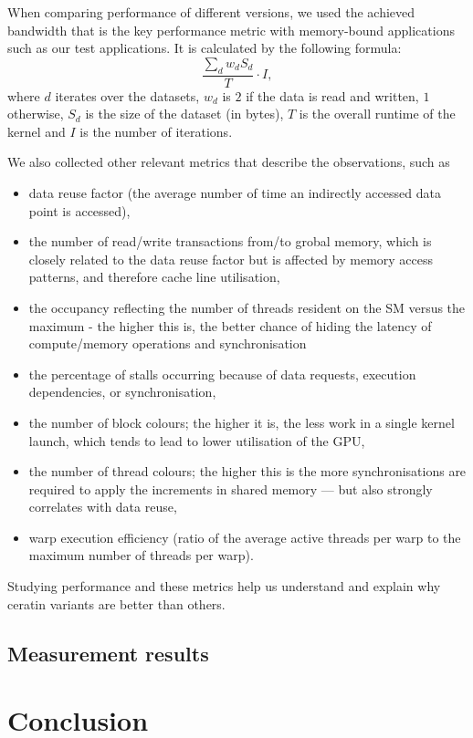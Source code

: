 When comparing performance of different versions, we used the achieved bandwidth
that is the key performance metric with memory-bound applications such as our
test applications. It is calculated by the following formula: $$\frac{\sum_{d}
w_dS_d}{T} \cdot I,$$ where $d$ iterates over the datasets, $w_d$ is $2$ if the
data is read and written, $1$ otherwise, $S_d$ is the size of the dataset (in
bytes), $T$ is the overall runtime of the kernel and $I$ is the number of
iterations.

We also collected other relevant metrics that describe the observations, such as 
\begin{itemize}
  \item data reuse factor (the average number of time an indirectly accessed
    data point is accessed),
  \item the number of read/write transactions from/to grobal memory, which is
    closely related to the data reuse factor but is affected by memory access
    patterns, and therefore cache line utilisation,
  \item the occupancy reflecting the number of threads resident on the SM versus
    the maximum - the higher this is, the better chance of hiding the latency of
    compute/memory operations and synchronisation
  \item the percentage of stalls occurring because of data requests, execution
    dependencies, or synchronisation,
   \item the number of block colours; the higher it is, the less work in a
     single kernel launch, which tends to lead to lower utilisation of the GPU,
  \item the number of thread colours; the higher this is the more
    synchronisations are required to apply the increments in shared memory ---
    but also strongly correlates with data reuse,
  \item warp execution efficiency (ratio of the average active threads per warp
    to the maximum number of threads per warp).
\end{itemize}
Studying performance and these metrics help us understand and explain why
ceratin variants are better than others.

\subsection{Measurement results}\label{measurement-results}



\section{Conclusion}\label{conclusion}

